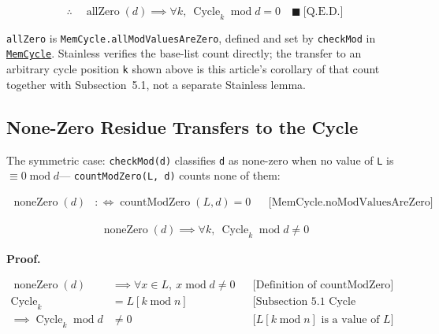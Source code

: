\begin{equation*}
\therefore\quad
\operatorname{allZero}(d)
  \implies \forall k,\ \operatorname{Cycle}_k\operatorname{mod}d=0
  \quad \blacksquare\ \text{[Q.E.D.]}
\end{equation*}

\texttt{allZero} is \texttt{MemCycle.allModValuesAreZero}, defined and set by
\texttt{checkMod} in
\href{https://github.com/thiagomata/prime-numbers/blob/cycle-article-v1.0.0/src/main/scala/v1/chapter4/cycle/memory/MemCycle.scala}{\texttt{MemCycle}}.
Stainless verifies the base-list count directly; the transfer to an arbitrary
cycle position \texttt{k} shown above is this article's corollary of that count
together with Subsection~5.1, not a separate Stainless lemma.

\subsection{None-Zero Residue Transfers to the Cycle}

The symmetric case: \texttt{checkMod(d)} classifies \texttt{d} as none-zero
when no value of \texttt{L} is $\equiv 0\operatorname{mod}d$---
\texttt{countModZero(L, d)} counts none of them:

\begin{equation*}
\begin{aligned}
\operatorname{noneZero}(d)
  &:\Leftrightarrow \operatorname{countModZero}(L,d)=0
  && \text{[MemCycle.noModValuesAreZero]}
\end{aligned}
\end{equation*}

\begin{equation*}
\begin{aligned}
\operatorname{noneZero}(d)
  \implies \forall k,\ \operatorname{Cycle}_k\operatorname{mod}d\neq 0
\end{aligned}
\end{equation*}

\noindent\textbf{Proof.}

\begin{equation*}
\begin{aligned}
\operatorname{noneZero}(d)
  &\implies \forall x\in L,\ x\operatorname{mod}d\neq 0
  && \text{[Definition of countModZero]} \\
\operatorname{Cycle}_k
  &=L[k\operatorname{mod}n]
  && \text{[Subsection 5.1 Cycle Element Access]} \\
\implies \operatorname{Cycle}_k\operatorname{mod}d
  &\neq 0
  && \text{[$L[k\operatorname{mod}n]$ is a value of $L$]}
\end{aligned}
\end{equation*}

